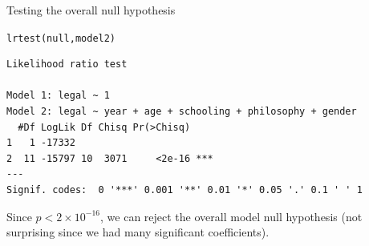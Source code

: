 \documentclass{beamer}\usepackage[]{graphicx}\usepackage[]{color}
\makeatletter
\newcommand{\hlstd}[1]{\textcolor[rgb]{1,0.894,0.769}{#1}}%
\newcommand{\hlkwd}[1]{\textcolor[rgb]{1,0.78,0.769}{#1}}%
\newenvironment{kframe}{%
 \def\at@end@of@kframe{}%
 \ifinner\ifhmode%
  \def\at@end@of@kframe{\end{minipage}}%
  \begin{minipage}{\columnwidth}%
 \fi\fi%
 \def\FrameCommand##1{\hskip\@totalleftmargin \hskip-\fboxsep
 \colorbox{shadecolor}{##1}\hskip-\fboxsep
     \hskip-\linewidth \hskip-\@totalleftmargin \hskip\columnwidth}%
 \MakeFramed {\advance\hsize-\width
   \@totalleftmargin\z@ \linewidth\hsize
   \@setminipage}}%
 {\par\unskip\endMakeFramed%
 \at@end@of@kframe}
\newenvironment{knitrout}{}{} %
\makeatother
\begin{document}
\begin{darkframes}
\begin{frame}[fragile]{Testing the overall null hypothesis}
\begin{knitrout}
\begin{kframe}
{\ttfamily\noindent\color{warningcolor}{Warning: package 'zoo' was built under R version 3.3.2}}\begin{alltt}
\hlkwd{lrtest}\hlstd{(null, model2)}
\end{alltt}
\begin{verbatim}
Likelihood ratio test

Model 1: legal ~ 1
Model 2: legal ~ year + age + schooling + philosophy + gender
  #Df LogLik Df Chisq Pr(>Chisq)    
1   1 -17332                        
2  11 -15797 10  3071     <2e-16 ***
---
Signif. codes:  0 '***' 0.001 '**' 0.01 '*' 0.05 '.' 0.1 ' ' 1
\end{verbatim}
\end{kframe}
\end{knitrout}
      \fontsize{11}{11}\selectfont
      \pause
      Since $p< 2\times 10^{-16}$, we can reject the overall model null hypothesis (not surprising since we had many significant coefficients).
    \end{frame}
  \end{darkframes}
\end{document}
